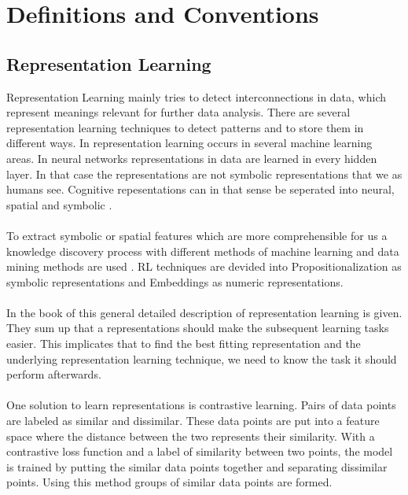 \section{Definitions and Conventions}\label{theory}
\subsection{Representation Learning}
Representation Learning mainly tries to detect interconnections in data, which represent meanings relevant for further data analysis. There are several representation learning techniques to detect patterns and to store them in different ways. In  representation learning occurs in several machine learning areas. In neural networks representations in data are learned in every hidden layer. In that case the representations are not symbolic representations that we as humans see. Cognitive repesentations can in that sense be seperated into neural, spatial and symbolic \cite{gardenfors_conceptual_2000}.\\\\
To extract symbolic or spatial features which are more comprehensible for us a knowledge discovery process with different methods of machine learning and data mining methods are used \cite[p. 4]{lavrac_representation_2021}. RL techniques are devided into Propositionalization as symbolic representations and Embeddings as numeric representations.\\\\
In the book of  this general detailed description of representation learning is given. They sum up that a representations should make the subsequent learning tasks easier. This implicates that to find the best fitting representation and the underlying representation learning technique, we need to know the task it should perform afterwards.\\\\
One solution to learn representations is contrastive learning. Pairs of data points are labeled as similar and dissimilar. These data points are put into a feature space where the distance between the two represents their similarity. With a contrastive loss function and a label of similarity between two points, the model is trained by putting the similar data points together and separating dissimilar points. Using this method groups of similar data points are formed. \\\\

